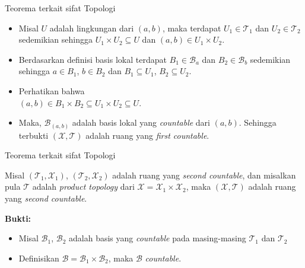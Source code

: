     \begin{frame}{Teorema terkait sifat Topologi}
        \begin{itemize}
            \item Misal $U$ adalah lingkungan dari $(a,b)$, maka terdapat $U_1\in\mathcal{T}_1$ dan $U_2\in\mathcal{T}_2$ sedemikian sehingga $U_1\times U_2\subseteq U$ dan $(a,b)\in U_1\times U_2$.
            \item Berdasarkan definisi basis lokal terdapat $B_1\in \mathcal{B}_a$ dan $B_2\in\mathcal{B}_b$ sedemikian sehingga $a\in B_1$, $b\in B_2$ dan $B_1\subseteq U_1$, $B_2\subseteq U_2$.
            \item Perhatikan bahwa\\
            $(a,b) \in B_1\times B_2 \subseteq U_1\times U_2 \subseteq U$.
            \item Maka, $\mathcal{B}_{(a,b)}$ adalah basis lokal yang \textit{countable} dari $(a,b)$. Sehingga terbukti $(\mathcal{X}, \mathcal{T})$ adalah ruang yang \textit{first countable}.
        \end{itemize}
    \end{frame}
    
    \begin{frame}{Teorema terkait sifat Topologi}
    \begin{tcolorbox}[enhanced,title=Teorema 2.26,frame style tile = {width=\paperwidth}{wallpaper}]
        Misal $(\mathcal{T}_1,\mathcal{X}_1)$, $(\mathcal{T}_2,\mathcal{X}_2)$ adalah ruang yang \textit{second countable}, dan misalkan pula $\mathcal{T}$ adalah \textit{product topology} dari $\mathcal{X}=\mathcal{X}_1\times\mathcal{X}_2$, maka $(\mathcal{X}, \mathcal{T})$ adalah ruang yang \textit{second countable}.
    \end{tcolorbox}
    \textbf{Bukti:}
    \begin{itemize}
        \item Misal $\mathcal{B}_1$, $\mathcal{B}_2$ adalah basis yang \textit{countable} pada masing-masing $\mathcal{T}_1$ dan $\mathcal{T}_2$
        \item Definisikan $\mathcal{B} = \mathcal{B}_1 \times \mathcal{B}_2$, maka $\mathcal{B}$ \textit{countable}.
    \end{itemize}
    \end{frame}
    
